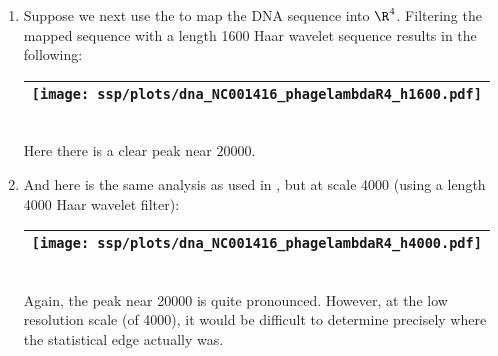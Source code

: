 \begin{example}
\begin{enumerate}
  \item \label{item:dnapl_R6}
    Suppose we next use the   to map
    the DNA sequence into $\R^4$.
    Filtering the mapped sequence with a length 1600 Haar wavelet sequence results in the following:
     \\\begin{tabular}{|>{\scs}c|}
          \hline
          \texttt{[image: ssp/plots/dna\_NC001416\_phagelambdaR4\_h1600.pdf]}%
        \\\hline
     \end{tabular}\\
     Here there is a clear peak near $20000$.

  \item And here is the same analysis as used in , but at scale 4000
        (using a length 4000 Haar wavelet filter):
     \\\begin{tabular}{|>{\scs}c|}
          \hline
          \texttt{[image: ssp/plots/dna\_NC001416\_phagelambdaR4\_h4000.pdf]}%
        \\\hline
     \end{tabular}\\
     Again, the peak near 20000 is quite pronounced.
     However, at the low resolution scale (of 4000), it would be difficult to determine precisely where the
     statistical edge actually was.
\end{enumerate}
\end{example}



